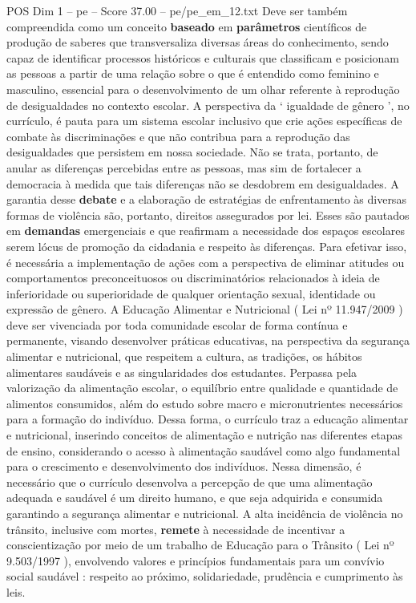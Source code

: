\begin{textsample}{POS Dim 1 – pe – Score 37.00 – pe/pe\_em\_12.txt}
Deve ser também compreendida como um conceito \textbf{baseado} em \textbf{parâmetros} científicos de produção de saberes que transversaliza diversas áreas do conhecimento, sendo capaz de identificar processos históricos e culturais que classificam e posicionam as pessoas a partir de uma relação sobre o que é entendido como feminino e masculino, essencial para o desenvolvimento de um olhar referente à reprodução de desigualdades no contexto escolar.
A perspectiva da ‘ igualdade de gênero ’, no currículo, é pauta para um sistema escolar inclusivo que crie ações específicas de combate às discriminações e que não contribua para a reprodução das desigualdades que persistem em nossa sociedade.
Não se trata, portanto, de anular as diferenças percebidas entre as pessoas, mas sim de fortalecer a democracia à medida que tais diferenças não se desdobrem em desigualdades.
A garantia desse \textbf{debate} e a elaboração de estratégias de enfrentamento às diversas formas de violência são, portanto, direitos assegurados por lei.
Esses são pautados em \textbf{demandas} emergenciais e que reafirmam a necessidade dos espaços escolares serem lócus de promoção da cidadania e respeito às diferenças.
Para efetivar isso, é necessária a implementação de ações com a perspectiva de eliminar atitudes ou comportamentos preconceituosos ou discriminatórios relacionados à ideia de inferioridade ou superioridade de qualquer orientação sexual, identidade ou expressão de gênero.
A Educação Alimentar e Nutricional ( Lei nº 11.947/2009 ) deve ser vivenciada por toda comunidade escolar de forma contínua e permanente, visando desenvolver práticas educativas, na perspectiva da segurança alimentar e nutricional, que respeitem a cultura, as tradições, os hábitos alimentares saudáveis e as singularidades dos estudantes.
Perpassa pela valorização da alimentação escolar, o equilíbrio entre qualidade e quantidade de alimentos consumidos, além do estudo sobre macro e micronutrientes necessários para a formação do indivíduo.
Dessa forma, o currículo traz a educação alimentar e nutricional, inserindo conceitos de alimentação e nutrição nas diferentes etapas de ensino, considerando o acesso à alimentação saudável como algo fundamental para o crescimento e desenvolvimento dos indivíduos.
Nessa dimensão, é necessário que o currículo desenvolva a percepção de que uma alimentação adequada e saudável é um direito humano, e que seja adquirida e consumida garantindo a segurança alimentar e nutricional.
A alta incidência de violência no trânsito, inclusive com mortes, \textbf{remete} à necessidade de incentivar a conscientização por meio de um trabalho de Educação para o Trânsito ( Lei nº 9.503/1997 ), envolvendo valores e princípios fundamentais para um convívio social saudável : respeito ao próximo, solidariedade, prudência e cumprimento às leis.

\end{textsample}
